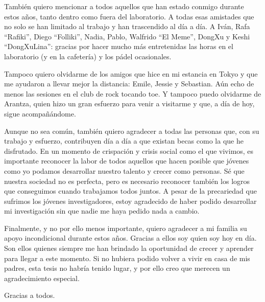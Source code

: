 También quiero mencionar a todos aquellos que han estado conmigo durante estos años, tanto dentro como fuera del laboratorio.
A todas esas amistades que no solo se han limitado al trabajo y han trascendido al día a día.
A Iván, Rafa ``Rafiki'', Diego ``Folliki'', Nadia, Pablo, Walfrido ``El Meme'', DongXu y Keshi ``DongXuLina'': gracias por hacer mucho más entretenidas las horas en el laboratorio (y en la cafetería) y los pádel ocasionales.

Tampoco quiero olvidarme de los amigos que hice en mi estancia en Tokyo y que me ayudaron a llevar mejor la distancia: Emile, Jessie y Sebastian.
Aún echo de menos las sesiones en el club de rock tocando toe.
Y tampoco puedo olvidarme de Arantza, quien hizo un gran esfuerzo para venir a visitarme y que, a día de hoy, sigue acompañándome.

Aunque no sea común, también quiero agradecer a todas las personas que, con su trabajo y esfuerzo, contribuyen día a día a que existan becas como la que he disfrutado.
En un momento de crispación y crisis social como el que vivimos, es importante reconocer la labor de todos aquellos que hacen posible que jóvenes como yo podamos desarrollar nuestro talento y crecer como personas.
Sé que nuestra sociedad no es perfecta, pero es necesario reconocer también los logros que conseguimos cuando trabajamos todos juntos.
A pesar de la precariedad que sufrimos los jóvenes investigadores, estoy agradecido de haber podido desarrollar mi investigación sin que nadie me haya pedido nada a cambio.

Finalmente, y no por ello menos importante, quiero agradecer a mi familia su apoyo incondicional durante estos años.
Gracias a ellos soy quien soy hoy en día.
Son ellos quienes siempre me han brindado la oportunidad de crecer y aprender para llegar a este momento.
Si no hubiera podido volver a vivir en casa de mis padres, esta tesis no habría tenido lugar, y por ello creo que merecen un agradecimiento especial.

Gracias a todos.




